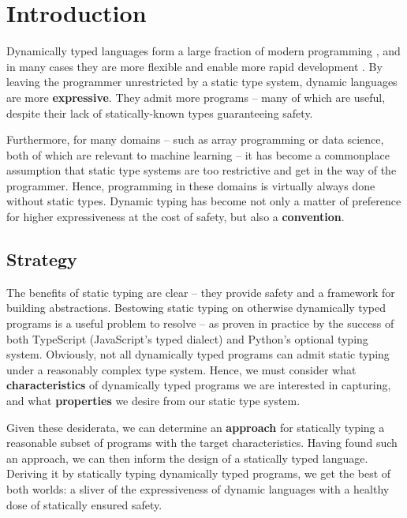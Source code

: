 \chapter{Introduction}
\label{introduction}

Dynamically typed languages form a large fraction of modern programming \cite{stack-overflow-survey}, and in many cases they are more flexible and enable more rapid development \cite{gradual-typing}.
By leaving the programmer unrestricted by a static type system, dynamic languages are more \textbf{expressive}. They admit more programs -- many of which are useful, despite their lack of statically-known types guaranteeing safety.

Furthermore, for many domains -- such as array programming or data science, both of which are relevant to machine learning -- it has become a commonplace assumption that static type systems are too restrictive and get in the way of the programmer. Hence, programming in these domains is virtually always done without static types.
Dynamic typing has become not only a matter of preference for higher expressiveness at the cost of safety, but also a \textbf{convention}.

\section{Strategy}

The benefits of static typing are clear -- they provide safety and a framework for building abstractions. Bestowing static typing on otherwise dynamically typed programs is a useful problem to resolve -- as proven in practice by the success of both TypeScript (JavaScript's typed dialect) and Python's optional typing system. 
Obviously, not all dynamically typed programs can admit static typing under a reasonably complex type system. 
Hence, we must consider what \textbf{characteristics} of dynamically typed programs we are interested in capturing, and what \textbf{properties} we desire from our static type system. 

Given these desiderata, we can determine an \textbf{approach} for statically typing a reasonable subset of programs with the target characteristics.
Having found such an approach, we can then inform the design of a statically typed language.
Deriving it by statically typing dynamically typed programs, we get the best of both worlds: a sliver of the expressiveness of dynamic languages with a healthy dose of statically ensured safety.

